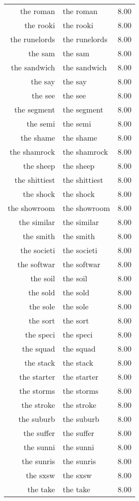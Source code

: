\begin{table}[ht]
\begin{tabular}{rlr}
  the roman & the roman & 8.00 \\ 
  the rooki & the rooki & 8.00 \\ 
  the runelords & the runelords & 8.00 \\ 
  the sam & the sam & 8.00 \\ 
  the sandwich & the sandwich & 8.00 \\ 
  the say & the say & 8.00 \\ 
  the see & the see & 8.00 \\ 
  the segment & the segment & 8.00 \\ 
  the semi & the semi & 8.00 \\ 
  the shame & the shame & 8.00 \\ 
  the shamrock & the shamrock & 8.00 \\ 
  the sheep & the sheep & 8.00 \\ 
  the shittiest & the shittiest & 8.00 \\ 
  the shock & the shock & 8.00 \\ 
  the showroom & the showroom & 8.00 \\ 
  the similar & the similar & 8.00 \\ 
  the smith & the smith & 8.00 \\ 
  the societi & the societi & 8.00 \\ 
  the softwar & the softwar & 8.00 \\ 
  the soil & the soil & 8.00 \\ 
  the sold & the sold & 8.00 \\ 
  the sole & the sole & 8.00 \\ 
  the sort & the sort & 8.00 \\ 
  the speci & the speci & 8.00 \\ 
  the squad & the squad & 8.00 \\ 
  the stack & the stack & 8.00 \\ 
  the starter & the starter & 8.00 \\ 
  the storms & the storms & 8.00 \\ 
  the stroke & the stroke & 8.00 \\ 
  the suburb & the suburb & 8.00 \\ 
  the suffer & the suffer & 8.00 \\ 
  the sunni & the sunni & 8.00 \\ 
  the sunris & the sunris & 8.00 \\ 
  the sxsw & the sxsw & 8.00 \\ 
  the take & the take & 8.00 \\ 

\end{tabular}
\end{table}
